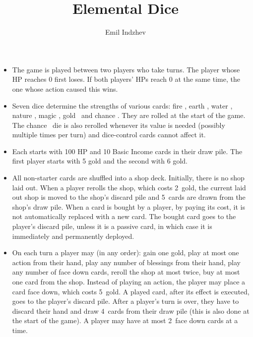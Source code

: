 \documentclass[dvipsnames,parskip,a4paper]{scrartcl}
\title{Elemental Dice}
\author{Emil Indzhev}
\newcommand{\iconsize}{3.4mm}
\newcommand{\icondepth}{0.45mm}
\newcommand{\icon}[1]{\raisebox{-\icondepth}{\texttt{[image:  \#1 ]}}}
\newcommand{\fire}{\icon{icons/fire.png}}
\newcommand{\earth}{\icon{icons/earth.png}}
\newcommand{\water}{\icon{icons/water.png}}
\newcommand{\nature}{\icon{icons/nature.png}}
\newcommand{\magic}{\icon{icons/magic.png}}
\newcommand{\gold}{\icon{icons/gold.png}}
\newcommand{\chance}{\icon{icons/chance.png}}
\newcommand{\rerollcost}{2}
\newcommand{\facedowncost}{5}
\newcommand{\handsize}{4}
\newcommand{\dacedownsize}{2}
\newcommand{\shopsize}{5}
\begin{document}
\maketitle

\begin{itemize}

\item

The game is played between two players who take turns. The player whose HP reaches 0 first loses. If both players' HPs reach 0 at the same time, the one whose action caused this wins.

\item

Seven dice determine the strengths of various cards: fire \fire, earth \earth, water \water, nature \nature, magic \magic, gold \gold \ and chance \chance. They are rolled at the start of the game. The chance \chance \ die is also rerolled whenever its value is needed (possibly multiple times per turn) and dice-control cards cannot affect it.

\item

Each starts with 100 HP and 10 Basic Income cards in their draw pile. The first player starts with 5 gold and the second with 6 gold.

\item

All non-starter cards are shuffled into a shop deck. Initially, there is no shop laid out. When a player rerolls the shop, which costs \rerollcost \ gold, the current laid out shop is moved to the shop's discard pile and \shopsize \ cards are drawn from the shop's draw pile. When a card is bought by a player, by paying its cost, it is not automatically replaced with a new card. The bought card goes to the player's discard pile, unless it is a passive card, in which case it is immediately and permanently deployed.

\item

On each turn a player may (in any order): gain one gold, play at most one action from their hand, play any number of blessings from their hand, play any number of face down cards, reroll the shop at most twice, buy at most one card from the shop. Instead of playing an action, the player may place a card face down, which costs \facedowncost \ gold. A played card, after its effect is executed, goes to the player's discard pile. After a player's turn is over, they have to discard their hand and draw \handsize \ cards from their draw pile (this is also done at the start of the game). A player may have at most \dacedownsize \ face down cards at a time.


\end{itemize}
\end{document}
